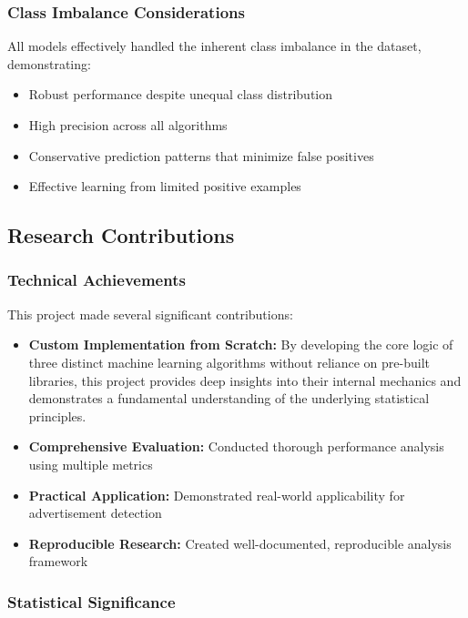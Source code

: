 \subsubsection{Class Imbalance Considerations}

All models effectively handled the inherent class imbalance in the dataset, demonstrating:
\begin{itemize}
    \item Robust performance despite unequal class distribution
    \item High precision across all algorithms
    \item Conservative prediction patterns that minimize false positives
    \item Effective learning from limited positive examples
\end{itemize}

\subsection{Research Contributions}

\subsubsection{Technical Achievements}

This project made several significant contributions:

\begin{itemize}
    \item \textbf{Custom Implementation from Scratch:} By developing the core logic of three distinct machine learning algorithms without reliance on pre-built libraries, this project provides deep insights into their internal mechanics and demonstrates a fundamental understanding of the underlying statistical principles.
    \item \textbf{Comprehensive Evaluation:} Conducted thorough performance analysis using multiple metrics
    \item \textbf{Practical Application:} Demonstrated real-world applicability for advertisement detection
    \item \textbf{Reproducible Research:} Created well-documented, reproducible analysis framework
\end{itemize}

\subsubsection{Statistical Significance}

